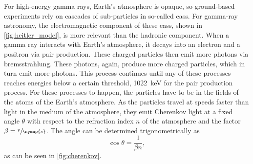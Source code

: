 For high-energy gamma rays, Earth's atmosphere is opaque, so ground-based experiments rely on
cascades of sub-particles in so-called \glspl{eas}. For gamma-ray astronomy, the electromagnetic
component of these \glspl{eas}, shown in \autoref{fig:heitler_model}, is more relevant
than the hadronic component. When a gamma ray interacts with Earth's atmosphere, it decays into an
electron and a positron via pair production. These charged particles then emit more photons via
bremsstrahlung. These photons, again, produce more charged particles, which in turn emit more
photons. This process continues until any of these processes reaches energies below a certain
threshold, \ie \SI{1022}{\kilo\eV} for the pair production process. For these processes to happen,
the particles have to be in the fields of the atoms of the Earth's atmosphere. As the particles
travel at speeds faster than light in the medium of the atmosphere, they emit Cherenkov light at
a fixed angle \(\theta\) with respect to the refraction index \(n\) of the atmosphere and the
factor \(\beta = \sfrac{v}{\symup{c}}\). The angle can be determined trigonometrically as
\begin{equation}
    \cos\theta = \frac{1}{\beta n},
\end{equation}
as can be seen in \autoref{fig:cherenkov}.



